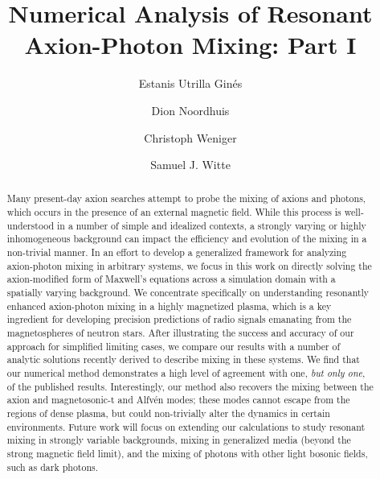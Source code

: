 \documentclass[twocolumn,superscriptaddress,floatfix,preprintnumbers,prd,nofootinbib,aps,10pt]{revtex4-2}
\renewcommand\({\left(}
\renewcommand\){\right)}
\renewcommand\[{\left[}
\renewcommand\]{\right]}
\begin{document}
\title{Numerical Analysis of Resonant Axion-Photon Mixing: Part I}

\author{Estanis Utrilla Gin\'{e}s}
\author{Dion Noordhuis}
\author{Christoph Weniger}
\author{Samuel J. Witte}


\begin{abstract}
Many present-day axion searches attempt to probe the mixing of axions and photons, which occurs in the presence of an external magnetic field. While this process is well-understood in a number of simple and idealized contexts, a strongly varying or highly inhomogeneous background can impact the efficiency and evolution of the mixing in a non-trivial manner. In an effort to develop a generalized framework for analyzing axion-photon mixing in arbitrary systems, we focus in this work on directly solving the axion-modified form of Maxwell's equations across a simulation domain with a spatially varying background. We concentrate specifically on understanding resonantly enhanced axion-photon mixing in a highly magnetized plasma, which is a key ingredient for developing precision predictions of radio signals emanating from the magnetospheres of neutron stars. After illustrating the success and accuracy of our approach for simplified limiting cases, we compare our results with a number of analytic solutions recently derived to describe mixing in these systems. We find that our numerical method demonstrates a high level of agreement with one, \textit{but only one}, of the published results. Interestingly, our method also recovers the mixing between the axion and magnetosonic-t and Alfv\'{e}n modes; these modes cannot escape from the regions of dense plasma, but could non-trivially alter the dynamics in certain environments. Future work will focus on extending our calculations to study resonant mixing in strongly variable backgrounds, mixing in generalized media (beyond the strong magnetic field limit), and the mixing of photons with other light bosonic fields, such as dark photons.
\end{abstract}
\end{document}
